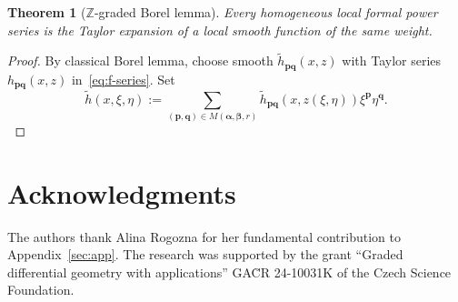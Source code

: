 \documentclass[a4paper,12pt]{amsart}
\newtheorem{theorem}{Theorem}
\newcommand{\Z}{{\mathbb Z}}
\begin{document}
\begin{theorem}[$\Z$-graded Borel lemma]\label{cor:gr-borel}\normalfont
Every homogeneous local formal power series is the Taylor expansion of a local smooth function of the same weight.
\end{theorem}
\noindent\begin{proof}
By classical Borel lemma, choose smooth $\tilde{h}_{\bm{p}\bm{q}}(x,z)$ with Taylor series $h_{\bm{p}\bm{q}}(x,z)$ in~\eqref{eq:f-series}. Set
\[
\tilde{h}(x,{\xi},{\eta}):=\sum_{(\bm{p},\bm{q})\in M(\bm{\alpha},\bm{\beta},r)} \tilde{h}_{\bm{p}\bm{q}}(x,z({\xi},{\eta})){\xi}^{\bm{p}}{\eta}^{\bm{q}}.
\]
$\qedhere$
\end{proof}

\section*{Acknowledgments}

\smallskip\noindent
The authors thank Alina Rogozna for her fundamental contribution to Appendix~\ref{sec:app}.
The research was supported by the grant ``Graded differential geometry with applications'' GA\u{C}R 24-10031K of the Czech Science Foundation. 



\end{document}

